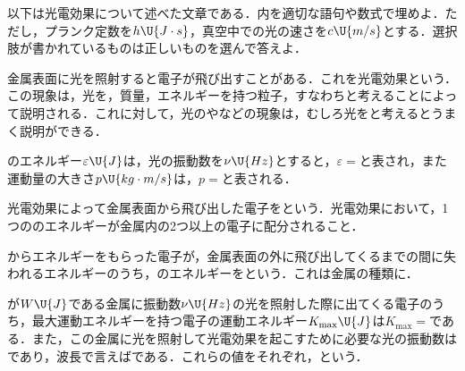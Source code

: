 \hspace{1zw}以下は光電効果について述べた文章である．\framebox[3zw]{\rule{0pt}{1.1zw}}内を適切な語句や数式で埋めよ．ただし，プランク定数を$h\U{J\cdot s}$，真空中での光の速さを$c\U{m/s}$とする．選択肢が書かれているものは正しいものを選んで答えよ．
\par
\hspace{1zw}金属表面に光を照射すると電子が飛び出すことがある．これを光電効果という．この現象は，光を，質量，エネルギーを持つ粒子，すなわちと考えることによって説明される．これに対して，光のやなどの現象は，むしろ光をと考えるとうまく説明ができる．
\par
\hspace{1zw}のエネルギー$\varepsilon\U{J}$は，光の振動数を$\nu\U{Hz}$とすると，$\varepsilon=$と表され，また運動量の大きさ$p\U{kg\cdot m/s}$は，$p=$と表される．
\par
\hspace{1zw}光電効果によって金属表面から飛び出した電子をという．光電効果において，1つののエネルギーが金属内の2つ以上の電子に配分されること．
\par
\hspace{1zw}からエネルギーをもらった電子が，金属表面の外に飛び出してくるまでの間に失われるエネルギーのうち，のエネルギーをという．これは金属の種類に．
\par
\hspace{1zw}が$W\U{J}$である金属に振動数$\nu\U{Hz}$の光を照射した際に出てくる電子のうち，最大運動エネルギーを持つ電子の運動エネルギー$K_{\max}\U{J}$は$K_{\max}=$である．また，この金属に光を照射して光電効果を起こすために必要な光の振動数はであり，波長で言えばである．これらの値をそれぞれ，という．


